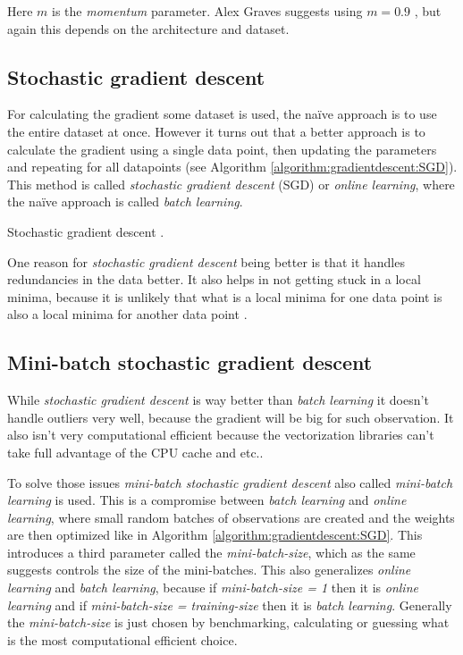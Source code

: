Here $m$ is the \textit{momentum} parameter. Alex Graves suggests using $m = 0.9$ \cite{alexgraves}, but again this depends on the architecture and dataset.

\subsection{Stochastic gradient descent}

For calculating the gradient some dataset is used, the naïve approach is to use the entire dataset at once. However it turns out that a better approach is to calculate the gradient using a single data point, then updating the parameters and repeating for all datapoints (see Algorithm \ref{algorithm:gradientdescent:SGD}). This method is called \textit{stochastic gradient descent} (SGD) or \textit{online learning}, where the naïve approach is called \textit{batch learning}.

\begin{algorithm}[h]
 \DontPrintSemicolon
 \caption{Stochastic gradient descent \cite{alexgraves}.}
 \label{algorithm:gradientdescent:SGD}
\end{algorithm}

One reason for \textit{stochastic gradient descent} being better is that it handles redundancies in the data better. It also helps in not getting stuck in a local minima, because it is unlikely that what is a local minima for one data point is also a local minima for another data point \cite{bishop}.

\subsection{Mini-batch stochastic gradient descent}

While \textit{stochastic gradient descent} is way better than \textit{batch learning} it doesn't handle outliers very well, because the gradient will be big for such observation. It also isn't very computational efficient because the vectorization libraries can't take full advantage of the CPU cache and etc..

To solve those issues \textit{mini-batch stochastic gradient descent} also called \textit{mini-batch learning} is used. This is a compromise between \textit{batch learning} and \textit{online learning}, where small random batches of observations are created and the weights are then optimized like in Algorithm \ref{algorithm:gradientdescent:SGD}. This introduces a third parameter called the \textit{mini-batch-size}, which as the same suggests controls the size of the mini-batches. This also generalizes \textit{online learning} and \textit{batch learning}, because if \textit{mini-batch-size = 1} then it is \textit{online learning} and if \textit{mini-batch-size = training-size} then it is \textit{batch learning}. Generally the \textit{mini-batch-size} is just chosen by benchmarking, calculating or guessing what is the most computational efficient choice.

